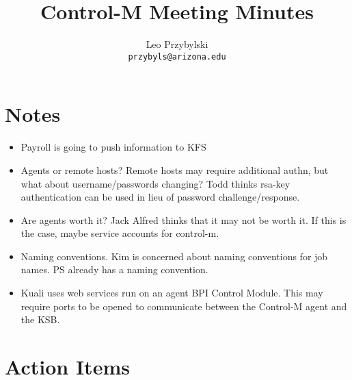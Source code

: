 \documentclass[12pt,notitlepage]{article}
\author{Leo Przybylski \\
\texttt{przybyls@arizona.edu}}
\title{Control-M Meeting Minutes}
\begin{document}
\maketitle
\section{Notes}
\begin{itemize}
  \item Payroll is going to push information to KFS
    
  \item Agents or remote hosts? Remote hosts may require additional authn, but what about 
    username/passwords changing? Todd thinks rsa-key authentication can be used in lieu of
    password challenge/response.

  \item Are agents worth it? Jack Alfred thinks that it may not be worth it. If this is the case,
    maybe service accounts for control-m.
    
  \item Naming conventions. Kim is concerned about naming conventions for job names. PS already has
    a naming convention.

  \item Kuali uses web services run on an agent BPI Control Module. This may require ports to be opened
    to communicate between the Control-M agent and the KSB.
    
\end{itemize}

\section{Action Items}
\end{document}
